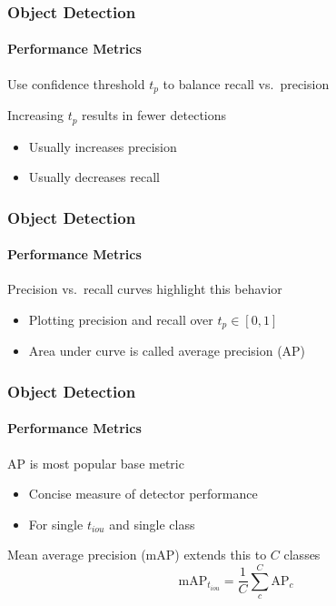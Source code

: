 \documentclass[xetex,professionalfont]{beamer}
\renewcommand\emph[1]{\textcolor{tuwcvl_cvl_blue}{#1}}
\begin{document}
\begin{frame}
	\frametitle{Object Detection}
	\framesubtitle{Performance Metrics}

	Use confidence threshold $t_p$ to balance recall vs.~precision

	\bigskip

	Increasing $t_p$ results in fewer detections
	\begin{itemize}
		\item Usually increases precision %
		\item Usually decreases recall %
	\end{itemize}

\end{frame}


\begin{frame}
	\frametitle{Object Detection}
	\framesubtitle{Performance Metrics}

	\emph{Precision vs.~recall curves} highlight this behavior
	\begin{itemize}
		\item Plotting precision and recall over $t_p\in[0,1]$
		\item Area under curve is called \emph{average precision} (AP)
	\end{itemize}

	\smallskip

	\begin{center}
	\end{center}

\end{frame}


\begin{frame}
	\frametitle{Object Detection}
	\framesubtitle{Performance Metrics}

	AP is most popular base metric
	\begin{itemize}
		\item Concise measure of detector performance
		\item For single $t_{iou}$ and single class
	\end{itemize}

	\bigskip

	\emph{Mean average precision} (mAP) extends this to $C$ classes
	\[
		\text{mAP}_{t_{iou}}=\frac{1}{C}\sum_c^C\text{AP}_c
	\]

\end{frame}
\end{document}
